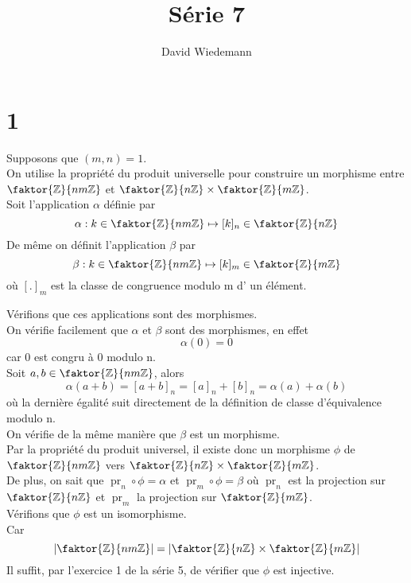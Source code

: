 \documentclass[11pt, a4paper, twoside]{article}
\newcommand{\f}{\faktor}
\DeclareMathOperator*{\pr}{pr}
\begin{document}
\title{Série 7}
\author{David Wiedemann}
\maketitle
\section*{1}
Supposons que $( m,n) =1$.\\
On utilise la propriété du produit universelle pour construire un morphisme entre $\f { \mathbb{Z}} { nm \mathbb{Z}} $ et $\f { \mathbb{Z}} { n \mathbb{Z}} \times \f { \mathbb{Z}} { m\mathbb{Z}} $.\\
Soit l'application $\alpha$ définie par
\[ 
\alpha : k \in \f { \mathbb{Z}} { nm\mathbb{Z}} \mapsto [ k] _n \in \f { \mathbb{Z}} { n\mathbb{Z}} 
\]
De même on définit l'application $\beta$ par
\[ 
\beta : k \in \f { \mathbb{Z}} { nm\mathbb{Z}} \mapsto [ k] _m \in \f { \mathbb{Z}} { m\mathbb{Z}} 
\]
où $[.]_m$ est la classe de congruence modulo m d' un élément.

Vérifions que ces applications sont des morphismes.\\
On vérifie facilement que $\alpha$ et $\beta$ sont des morphismes, en effet 
\[ 
	\alpha( 0) = 0
\]
car 0 est congru à 0 modulo n.\\
Soit $a,b \in \f { \mathbb{Z}} { nm\mathbb{Z}} $, alors
 \[ 
	 \alpha( a + b)  = [ a+b]_n = [ a]_n + [ b]_n = \alpha( a) + \alpha( b) 
\]
où la dernière égalité suit directement de la définition de classe d'équivalence modulo n.\\
On vérifie de la même manière que $\beta$ est un morphisme.\\
Par la propriété du produit universel, il existe donc un morphisme $\phi$ de $\f { \mathbb{Z} } { nm\mathbb{Z}} $ vers $\f { \mathbb{Z}} { n \mathbb{Z}} \times \f { \mathbb{Z}} { m \mathbb{Z}} $.\\

De plus, on sait que $\pr_n \circ \phi = \alpha$ et $\pr_m \circ \phi =\beta$ où $\pr_n$ est la projection sur $ \f { \mathbb{Z}} { n \mathbb{Z}}$ et $\pr_m  $ la projection sur $\f { \mathbb{Z}} { m \mathbb{Z}}$.\\

Vérifions que $\phi$ est un isomorphisme.\\
Car
\[
\left|\f { \mathbb{Z}} { nm \mathbb{Z}}\right| = \left|\f { \mathbb{Z}} { n \mathbb{Z}} \times\f { \mathbb{Z}} { m \mathbb{Z}}\right| 
\]
Il suffit, par l'exercice 1 de la série 5, de vérifier que $\phi$ est injective.\\
\end{document}
